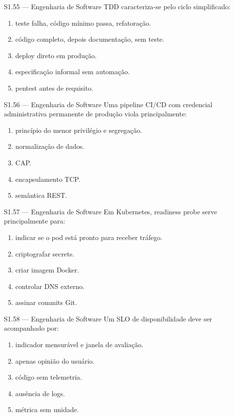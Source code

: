 \begin{questao}{S1.55 — Engenharia de Software}
TDD caracteriza-se pelo ciclo simplificado:
\begin{enumerate}[label=\Alph*)]\item teste falha, código mínimo passa, refatoração.\item código completo, depois documentação, sem teste.\item deploy direto em produção.\item especificação informal sem automação.\item pentest antes de requisito.\end{enumerate}
\end{questao}

\begin{questao}{S1.56 — Engenharia de Software}
Uma pipeline CI/CD com credencial administrativa permanente de produção viola principalmente:
\begin{enumerate}[label=\Alph*)]\item princípio do menor privilégio e segregação.\item normalização de dados.\item CAP.\item encapsulamento TCP.\item semântica REST.\end{enumerate}
\end{questao}

\begin{questao}{S1.57 — Engenharia de Software}
Em Kubernetes, readiness probe serve principalmente para:
\begin{enumerate}[label=\Alph*)]\item indicar se o pod está pronto para receber tráfego.\item criptografar secrets.\item criar imagem Docker.\item controlar DNS externo.\item assinar commits Git.\end{enumerate}
\end{questao}

\begin{questao}{S1.58 — Engenharia de Software}
Um SLO de disponibilidade deve ser acompanhado por:
\begin{enumerate}[label=\Alph*)]\item indicador mensurável e janela de avaliação.\item apenas opinião do usuário.\item código sem telemetria.\item ausência de logs.\item métrica sem unidade.\end{enumerate}
\end{questao}

